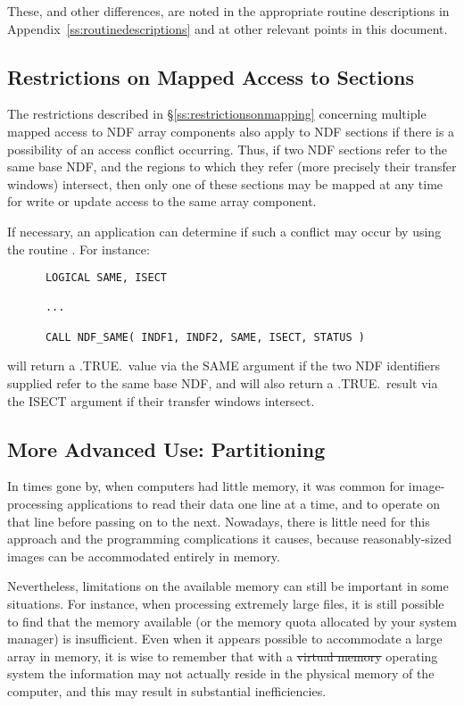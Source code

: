 These, and other differences, are noted in the appropriate routine
descriptions in Appendix~\ref{ss:routinedescriptions} and at other relevant
points in this document. 

\subsection{Restrictions on Mapped Access to Sections}

The restrictions described in \S\ref{ss:restrictionsonmapping} concerning
multiple mapped access to NDF array components also apply to NDF sections if
there is a possibility of an access conflict occurring. 
Thus, if two NDF sections refer to the same base NDF, and the regions to
which they refer (more precisely their transfer windows) intersect, then only
one of these sections may be mapped at any time for write or update access
to the same array component.

If necessary, an application can determine if such a conflict may occur by
using the routine . 
For instance:

\small
\begin{verbatim}
      LOGICAL SAME, ISECT

      ...

      CALL NDF_SAME( INDF1, INDF2, SAME, ISECT, STATUS )
\end{verbatim}
\normalsize

will return a .TRUE.\ value via the SAME argument if the two NDF identifiers 
supplied refer to the same base NDF, and will also return a .TRUE.\ result 
via the ISECT argument if their transfer windows intersect.

\subsection{\label{ss:partitioning}More Advanced Use: Partitioning}

In times gone by, when computers had little memory, it was common for
image-processing applications to read their data one line at a time, and
to operate on that line before passing on to the next. Nowadays, there
is little need for this approach and the programming complications it
causes, because reasonably-sized images can be accommodated entirely in
memory.

Nevertheless, limitations on the available memory can still be important in some
situations. For instance, when processing extremely large files, it is still
possible to find that the memory available (or the memory quota allocated by
your system manager) is insufficient. Even when it appears possible to
accommodate a large array in memory, it is wise to remember that with
a \st{virtual memory\/} operating system the information may not
actually reside in 
the physical memory of the computer, and this may result in substantial
inefficiencies.

